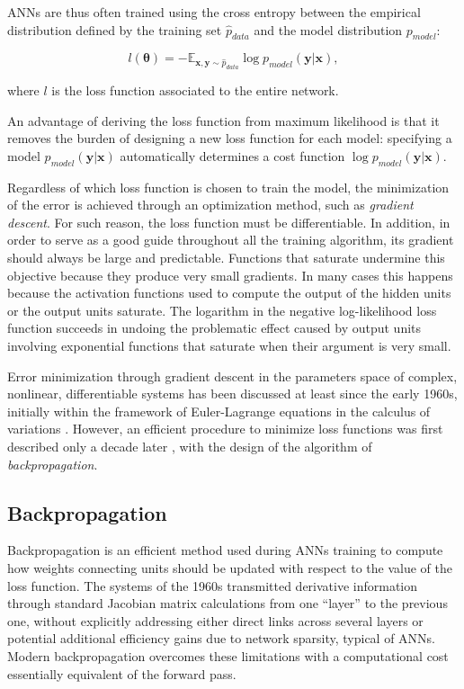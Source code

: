 ANNs are thus often trained using the cross entropy between the empirical distribution defined by the training set $\hat{p}_{data}$ and the model distribution $p_{model}$:

\begin{equation}
l(\bm{\theta}) = - \mathbb{E}_{\bm{x}, \bm{y} \sim \hat{p}_{data}} \log p_{model}(\bm{y}|\bm{x}),
\end{equation}

where $l$ is the loss function associated to the entire network.

An advantage of deriving the loss function from maximum likelihood is that it removes the burden of designing a new loss function for each model: specifying a model $p_{model}(\bm{y} | \bm{x})$ automatically determines a cost function $\log p_{model}(\bm{y} | \bm{x})$.

Regardless of which loss function is chosen to train the model, the minimization of the error is achieved through an optimization method, such as \textit{gradient descent}. For such reason, the loss function must be differentiable. In addition, in order to serve as a good guide throughout all the training algorithm, its gradient should always be large and predictable. Functions that saturate undermine this objective because they produce very small gradients. In many cases
this happens because the activation functions used to compute the output of the hidden units or the output units saturate. The logarithm in the negative log-likelihood loss function succeeds in undoing the problematic effect caused by output units involving exponential functions that saturate when their argument is very small.

Error minimization through gradient descent \cite{hadamard1908memoire} in the parameters space of
complex, nonlinear, differentiable systems has been discussed at least since the early 1960s, initially within the framework of Euler-Lagrange equations in the calculus of variations \cite{Euler:1744}. However, an efficient procedure to minimize loss functions was first described only a decade later \cite{Linnainmaa:1970}\cite{Linnainmaa:1976}, with the design of the algorithm of \textit{backpropagation}.



\subsection{Backpropagation}

Backpropagation is an efficient method used during ANNs training to compute how weights connecting units should be updated with respect to the value of the loss function.
The systems of the 1960s transmitted derivative information through standard Jacobian matrix calculations from one ``layer'' to the previous one, without explicitly addressing either direct links across several layers or potential additional efficiency gains due to network sparsity, typical of ANNs.
Modern backpropagation overcomes these limitations with a computational cost essentially equivalent of the forward pass.

